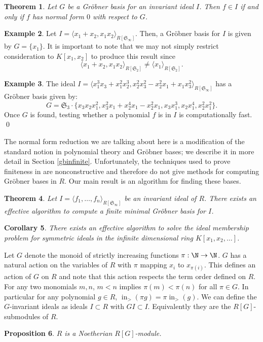 \documentclass{amsart}
\newtheorem{theorem}{Theorem}[section]
\newtheorem{proposition}[theorem]{Proposition}
\newtheorem{corollary}[theorem]{Corollary}
\theoremstyle{definition}
\newtheorem{example}[theorem]{Example}
\theoremstyle{remark}
\numberwithin{equation}{section}
\newcommand{\<}{\langle}
\renewcommand{\>}{\rangle}
\newcommand{\LT}{\operatorname{in}_>}
\begin{document}
\begin{theorem}
Let $G$ be a Gr\"obner basis for an invariant ideal $I$.  Then $f \in I$ 
if and only if $f$ has normal form $0$ with respect to $G$.
\end{theorem}

\begin{example}\label{trunccounterex}
Let $I = \<x_1 + x_2, x_1 x_2\>_{R[{\mathfrak S}_{\infty}]}$.  Then, a
Gr\"obner basis for $I$ is given by $G = \{x_1\}$.  It is important to note that we may not 
simply restrict consideration to $K[x_1,x_2]$ to produce this result since
\[  \<x_1 + x_2, x_1 x_2\>_{R[{\mathfrak S}_{2}]} \neq  \<x_1\>_{R[{\mathfrak S}_{2}]}.\]
\end{example}

\begin{example}
The ideal $I = \<x_1^3 x_3 + x_1^2 x_2^3, 
x_2^2 x_3^2 - x_2^2 x_1 + x_1 x_3^2\>_{R[{\mathfrak S}_{\infty}]}$ has a 
Gr\"obner basis given by:
\[ G = {\mathfrak S}_{3} \cdot \{x_3 x_2 x_1^2, x_3^2 x_1 + x_2^4 x_1 - x_2^2 x_1, 
x_3 x_1^3, x_2 x_1^4, x_2^2 x_1^2\}.\]
Once $G$ is found, testing whether a polynomial $f$ is in $I$ is computationally fast.
\qed
\end{example}

The normal form reduction we are talking about here is a modification of the
standard notion in polynomial theory and Gr\"obner bases;  
we describe it in more detail in Section \ref{gbinfinite}.
Unfortunately, the techniques used to
prove finiteness in \cite{AH} are nonconstructive and therefore do not
give methods for computing Gr\"obner bases in $R$.
Our main result is an algorithm for finding these bases.

\begin{theorem}
Let $I = \<f_1, \ldots, f_n\>_{R[{\mathfrak S}_{\infty}]}$ be an invariant ideal of $R$.
There exists an effective algorithm to compute a finite minimal Gr\"obner basis for $I$.
\end{theorem}

\begin{corollary}
There exists an effective algorithm to solve the ideal membership problem
for symmetric ideals in the infinite dimensional ring $K[x_1,x_2,\ldots]$.
\end{corollary}

Let $G$ denote the monoid of strictly increasing functions $\pi : \N \to \N$.  $G$ has a natural action on the variables of $R$ with $\pi$ mapping $x_i$ to $x_{\pi(i)}$.  This defines an action of $G$ on $R$ and note that this action respects the term order defined on $R$.  For any two monomials $m,n$, $m < n$ implies $\pi(m) < \pi(n)$ for all $\pi \in G$.  In particular for any polynomial $g \in R$, $\LT(\pi g) = \pi \LT(g)$.  We can define the $G$-invariant ideals as ideals $I \subset R$ with $G I \subset I$.  Equivalently they are the $R[G]$-submodules of $R$.
\begin{proposition}
 $R$ is a Noetherian $R[G]$-module.
\end{proposition}
\end{document}
